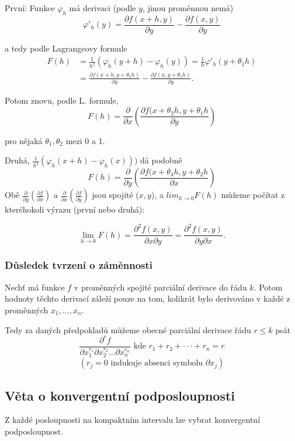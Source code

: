 \documentclass[../main.tex]{subfiles}
\begin{document}
První: Funkce $\varphi_h$ má derivaci (podle $y$, jinou proměnnou nemá)
\[\varphi'_h(y)=\frac{\partial f(x+h,y)}{\partial y}-\frac{\partial f(x,y)}{\partial y}\]

a tedy podle Lagrangeovy formule
\begin{align*}
    F(h) & = \frac{1}{h^2}(\varphi_h(y+h)-\varphi_h(y)) = \frac{1}{h}\varphi'_h(y+\theta_1h)\\
    & = \frac{\partial f(x+h,y+\theta_1h)}{\partial y} -\frac{\partial f(x,y+\theta_1h)}{\partial y}.
\end{align*}

Potom znovu, podle L. formule,
\[F(h) = \frac{\partial }{\partial x}\left(\frac{\partial f(x+\theta_2h,y+\theta_1h}{\partial y}\right)\]

pro nějaká $\theta_1,\theta_2$ mezi 0 a 1.

Druhá, $\frac{1}{h^2}(\varphi_h(x+h) - \varphi_h(x)))$ dá podobně
\[F(h) = \frac{\partial }{\partial y}\left(\frac{\partial f(x+\theta_4h,y + \theta_2h}{\partial x}\right)\]
Obě $\frac{\partial }{\partial y}(\frac{\partial f}{\partial x})$ a $\frac{\partial }{\partial x}(\frac{\partial f}{\partial y})$ jsou spojité ($x,y$), a $lim_{h\rightarrow 0} F(h)$ můžeme počítat z kteréhokoli výrazu (první nebo druhá):

\[\lim_{h\rightarrow 0}F(h) = \frac{\partial ^2 f(x,y)}{\partial x \partial y} 
                            = \frac{\partial ^2 f(x,y)}{\partial y \partial x}.\]
\subsubsection{Důsledek tvrzení o záměnnosti}
\hspace{1.2mm}
Nechť má funkce $f$ v proměnných spojité parciální derivace do řádu $k$. Potom hodnoty těchto derivací
záleží pouze na tom, kolikrát bylo derivováno v každé z proměnných $x_1, ... , x_n$.

\noindent
\hspace{1.2mm}
Tedy za daných předpokladů můžeme obecné parciální derivace řádu $r \leq k$ psát
\[\frac{\partial ^r f}{\partial x^{r_1}_1 \partial x^{r_2}_2 ... \partial x_n^{r_n}} \text{ kde } r_1 + r_2 + \cdot \cdot \cdot + r_n = r \]
\[(r_j = 0 \text{ indukuje absenci symbolu } \partial x_j)\]

\subsection{Věta o konvergentní podposloupnosti}
\hspace{1.2mm}
\noindent
Z každé posloupnosti na kompaktním intervalu lze vybrat konvergentní podposloupnost.
\end{document}
